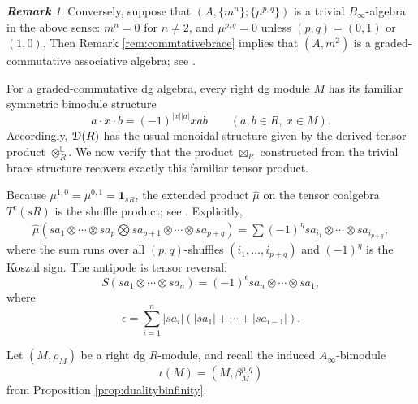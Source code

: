 \documentclass[a4paper, 11pt]{amsart}
\theoremstyle{definition}
\theoremstyle{remark}
\newtheorem{rem}[thm]{\bf Remark}
\numberwithin{equation}{section}
\newcommand{\id}{\mathbf{1}}
\newcommand{\ED}{\EuScript{D}}
\begin{document}
\begin{rem}
Conversely, suppose that $(A,\{m^n\};\{\mu^{p,q}\})$ is a trivial $B_\infty$-algebra in the above sense: $m^n=0$ for $n\neq2$, and $\mu^{p,q}=0$ unless $(p,q)=(0,1)$ or $(1,0)$. Then Remark \ref{rem:commtativebrace} implies that $(A,m^2)$ is a graded-commutative associative algebra; see \cite[Subsection 3.2]{Kad}.
\end{rem}

For a graded-commutative dg algebra, every right dg module $M$ has its familiar symmetric bimodule structure
\[
a\cdot x\cdot b=(-1)^{|x||a|}xab
\qquad
(a,b\in R,\ x\in M).
\]
Accordingly, $\ED(R)$ has the usual monoidal structure given by the derived tensor product $\otimes_R^{\mathbb L}$. We now verify that the product $\boxtimes_R$ constructed from the trivial brace structure recovers exactly this familiar tensor product.

Because $\mu^{1,0}=\mu^{0,1}=\id_{sR}$, the extended product $\widehat\mu$ on the tensor coalgebra $T^c(sR)$ is the shuffle product; see \cite[Section 1.3]{LoRo}. Explicitly,
\begin{align}\label{align:shfulle}
\widehat\mu
(sa_1\otimes\dotsb\otimes sa_p\bigotimes sa_{p+1}\otimes\dotsb\otimes sa_{p+q})
 =\sum(-1)^\eta sa_{i_1}\otimes\dotsb\otimes sa_{i_{p+q}},
\end{align}
where the sum runs over all $(p,q)$-shuffles $(i_1,\dotsc,i_{p+q})$ and $(-1)^\eta$ is the Koszul sign. The antipode is tensor reversal:
\[
S(sa_1\otimes\dotsb\otimes sa_n)
 =(-1)^\epsilon sa_n\otimes\dotsb\otimes sa_1,
\]
where
\[
\epsilon=\sum_{i=1}^{n}|sa_i|(|sa_1|+\dotsb+|sa_{i-1}|).
\]

Let $(M,\rho_M)$ be a right dg $R$-module, and recall the induced $A_\infty$-bimodule
\[
\iota(M)=(M,\beta_M^{p,q})
\]
from Proposition \ref{prop:dualitybinfinity}.
\end{document}
